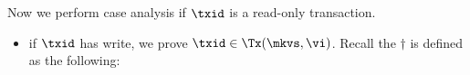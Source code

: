 \begin{itemize}
\begin{itemize}
    Now we perform case analysis if \( \txid \) is a read-only transaction.
    \begin{itemize}
        \item if \( \txid \) has write, we prove \( \txid \in \Tx(\mkvs, \vi)\).
        Recall the \( \dagger \) is defined as the following:
        \begin{equation}

\end{equation}
\end{itemize}
\end{itemize}
\end{itemize}
